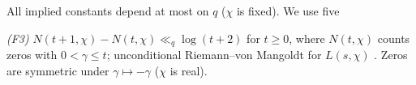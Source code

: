 All implied constants depend at most on $q$ ($\chi$ is fixed). We use
five

\emph{(F3)} $N(t+1,\chi)-N(t,\chi)\ll_q\log(t+2)$ for $t\ge0$, where
$N(t,\chi)$ counts zeros with $0<\gamma\le t$; unconditional
Riemann--von Mangoldt for $L(s,\chi)$ \cite[\S16]{Dav00}. Zeros are
symmetric under $\gamma\mapsto-\gamma$ ($\chi$ is real).

